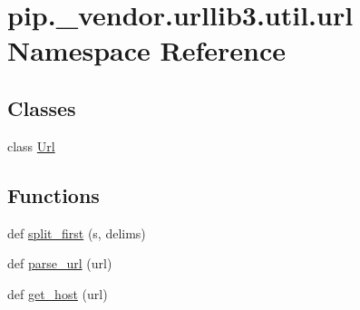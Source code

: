 \hypertarget{namespacepip_1_1__vendor_1_1urllib3_1_1util_1_1url}{}\section{pip.\+\_\+vendor.\+urllib3.\+util.\+url Namespace Reference}
\label{namespacepip_1_1__vendor_1_1urllib3_1_1util_1_1url}
\subsection*{Classes}
\begin{DoxyCompactItemize}
\item 
class \hyperlink{classpip_1_1__vendor_1_1urllib3_1_1util_1_1url_1_1Url}{Url}
\end{DoxyCompactItemize}
\subsection*{Functions}
\begin{DoxyCompactItemize}
\item 
def \hyperlink{namespacepip_1_1__vendor_1_1urllib3_1_1util_1_1url_a51103aab7c3a6fcb72e7d44eb263bd32}{split\+\_\+first} (s, delims)
\item 
def \hyperlink{namespacepip_1_1__vendor_1_1urllib3_1_1util_1_1url_a709c0a79b85ca84602eb4bd0ac0fbf79}{parse\+\_\+url} (url)
\item 
def \hyperlink{namespacepip_1_1__vendor_1_1urllib3_1_1util_1_1url_ad66398d277065c1d70e0379bed1a32c3}{get\+\_\+host} (url)
\end{DoxyCompactItemize}

